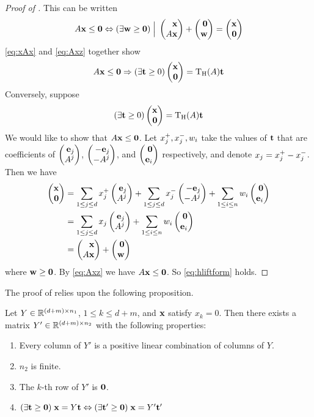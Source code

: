 \begin{proof}[Proof of ]
	This can be written
	\begin{equation} \label{eq:Axz}
		A\x \leq \0 \Leftrightarrow (\exists \w \geq \0) \St \xAx + \zw = \xz
	\end{equation}
	\eqref{eq:xAx} and \eqref{eq:Axz} together show
	\[ A\x \leq \0 \Rightarrow (\exists \t \geq 0) \xz = \HLift(A)\t \]
	Conversely, suppose
	\[ (\exists \t \geq 0) \xz = \HLift(A)\t \]
	We would like to show that $A\mathbf{x} \leq \mathbf{0}$.  Let $x_j^+,x_j^-,w_i$ take the values of $\mathbf{t}$ that are coefficients of $\eAj$, $\neAj$, and $\zei$ respectively, and denote $x_j = x_j^+ - x_j^-$.  Then we have
	\begin{align*}
		\xz & = \jsum \xjp \eAj + \jsum \xjm \neAj + \isum w_i\zei \\
		    & = \jsum x_j \eAj + \isum w_i\zei                     \\
		    & = \xAx + \zw
	\end{align*}
	where $\mathbf{w} \geq \mathbf{0}$.  By \eqref{eq:Axz} we have $A\mathbf{x} \leq \mathbf{0}$.  So \eqref{eq:hliftform} holds.
\end{proof}

The proof of  relies upon the following proposition.
\begin{Prop}\label{fm_vcone}
	Let ${Y \in \mathbb{R}^{(d+m)\times n_1}}$, $1 \leq k \leq d+m$, and $\mathbf{x}$ satisfy $x_k = 0$.  Then there exists a matrix $Y' \in \mathbb{R}^{(d+m)\times n_2}$ with the following properties:
	\begin{enumerate}
		\item Every column of $Y'$ is a positive linear combination of columns of $Y$.
		\item $n_2$ is finite.
		\item The $k$-th row of $Y'$ is $\mathbf{0}$.
		\item \((\exists \mathbf{t}\geq\mathbf{0})\;\mathbf{x} = Y\mathbf{t} \Leftrightarrow (\exists \mathbf{t}' \geq \mathbf{0})\;\mathbf{x} = Y'\mathbf{t}'\)
	\end{enumerate}
\end{Prop}

